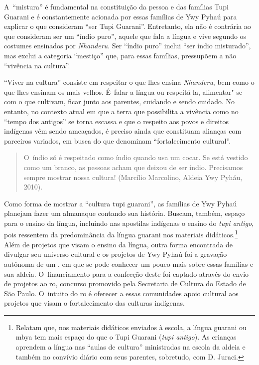 A~``mistura'' é fundamental na constituição da pessoa e das famílias Tupi
Guarani e é constantemente acionada por essas famílias de Ywy Pyhaú
para explicar o que consideram ``ser Tupi Guarani''. Entretanto, ela não é
contrária ao que consideram ser um ``índio puro'', aquele que fala a língua
e vive segundo os costumes ensinados por \emph{Nhanderu}. Ser ``índio puro''
inclui ``ser índio misturado'', mas exclui a categoria ``mestiço'' que, para
essas famílias, pressupõem a não ``vivência na cultura''.

``Viver na cultura'' consiste em respeitar o que lhes ensina \emph{Nhanderu}, bem
como o que lhes ensinam os mais velhos. É~falar a língua ou
respeitá-la, alimentar"-se com o que cultivam, ficar junto aos parentes,
cuidando e sendo cuidado. No entanto, no contexto atual em que a terra
que possibilita a vivência como no ``tempo dos antigos'' se torna escassa e
que o respeito aos povos e direitos indígenas vêm sendo ameaçados, é
preciso ainda que constituam alianças com parceiros variados, em busca
do que denominam ``fortalecimento cultural''. 

\begin{quote}
\noindent
O~índio só é respeitado como índio quando usa um cocar. Se está vestido
como um branco, as pessoas acham que deixou de ser índio. Precisamos
sempre mostrar nossa cultura! (Marcílio Marcolino, Aldeia Ywy Pyháu,
2010).
\end{quote}

Como forma de mostrar a ``cultura tupi guarani'', as famílias de Ywy Pyhaú
planejam fazer um almanaque contando sua história. Buscam, também,
espaço para o ensino da língua, incluindo nas apostilas indígenas o
ensino do \emph{tupi antigo}, pois ressentem da predominância da língua
guarani nos materiais didáticos.\footnote{Relatam que, nos materiais
didáticos enviados à escola, a língua guarani ou mbya tem mais espaço
do que o Tupi Guarani (\emph{tupi antigo}). As crianças aprendem a língua nas
``aulas de cultura'' ministradas na escola da aldeia e também no convívio
diário com seus parentes, sobretudo, com D. Juraci.} Além de projetos
que visam o ensino da língua, outra forma encontrada de divulgar seu
universo cultural e os projetos de Ywy Pyhaú foi a gravação autônoma de
um , em que se pode conhecer um pouco mais sobre essas famílias e
sua aldeia. O~financiamento para a confecção deste  foi captado
através do envio de projetos ao ro, concurso promovido pela
Secretaria de Cultura do Estado de São Paulo. O~intuito do ro é
oferecer a essas comunidades apoio cultural aos projetos que visam o
fortalecimento das culturas indígenas. 

